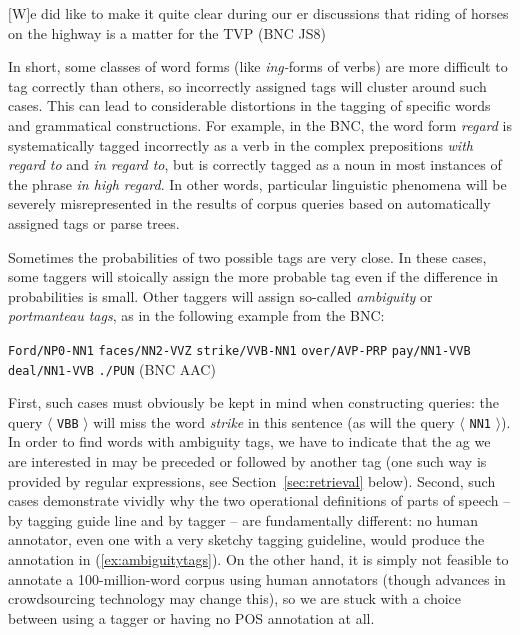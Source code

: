 \begin{exe}
\ex $[$W$]$e did like to make it quite clear during our er discussions that riding of horses on the highway is a matter for the TVP (BNC JS8)
\label{ex:thatriding}
\end{exe}

In short, some classes of word forms (like \textit{ing-}forms of verbs)  are more difficult to tag  correctly than others, so incorrectly assigned tags will cluster around such cases. This can lead to considerable distortions in the tagging of specific words and grammatical constructions. For example, in the BNC,  the word form \textit{regard} is systematically tagged incorrectly as a verb in the complex prepositions  \textit{with regard to} and \textit{in regard to}, but is correctly tagged  as a noun  in most instances of the phrase \textit{in high regard}. In other words, particular linguistic phenomena will be severely misrepresented in the results of corpus queries  based on automatically assigned tags or parse trees.

Sometimes the probabilities  of two possible tags are very close. In these cases, some taggers  will stoically assign the more probable tag even if the difference in probabilities is small. Other taggers will assign so\hyp{}called \textit{ambiguity}  or \textit{portmanteau tags}, as in the following example from the  BNC:

\begin{exe}
\ex \begin{minipage}[t]{0.85\textwidth} \raggedright \texttt{Ford/NP0\hyp{}NN1} \texttt{faces/NN2\hyp{}VVZ} \texttt{strike/VVB\hyp{}NN1} \texttt{over/AVP\hyp{}PRP} \texttt{pay/NN1\hyp{}VVB} \texttt{deal/NN1\hyp{}VVB} \texttt{./PUN} (BNC AAC) \end{minipage}
\label{ex:ambiguitytags}
\end{exe}


First, such cases must obviously be kept in mind when constructing queries:  the query $\langle$ \texttt{VBB} $\rangle$ will miss the word \textit{strike} in this sentence (as will the query $\langle$ \texttt{NN1} $\rangle$). In order to find words with ambiguity  tags, we have to indicate that the ag  we are interested in may be preceded or followed by another tag (one such way is provided by regular expressions, see Section~\ref{sec:retrieval} below). Second, such cases demonstrate vividly why the two operational  definitions of parts of speech -- by tagging guide line and by tagger -- are fundamentally different: no human annotator,  even one with a very sketchy tagging guideline, would produce the annotation in (\ref{ex:ambiguitytags}). On the other hand, it is simply not feasible to annotate  a 100\hyp{}million\hyp{}word corpus using human annotators (though advances in crowdsourcing technology may change this), so we are stuck with a choice between using a tagger  or having no POS annotation  at all.

